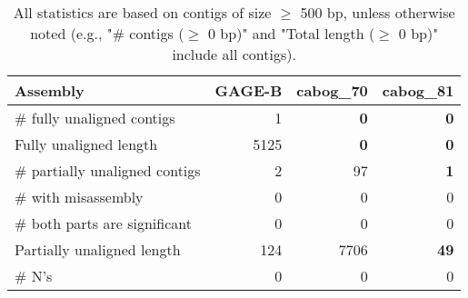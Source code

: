 \documentclass[12pt,a4paper]{article}
\begin{document}
\begin{table}[ht]
\begin{center}
\caption{All statistics are based on contigs of size $\geq$ 500 bp, unless otherwise noted (e.g., "\# contigs ($\geq$ 0 bp)" and "Total length ($\geq$ 0 bp)" include all contigs).}
\begin{tabular}{|l*{3}{|r}|}
\hline
Assembly & GAGE-B & cabog\_70 & cabog\_81 \\ \hline
\# fully unaligned contigs & 1 & {\bf 0} & {\bf 0} \\ \hline
Fully unaligned length & 5125 & {\bf 0} & {\bf 0} \\ \hline
\# partially unaligned contigs & 2 & 97 & {\bf 1} \\ \hline
\hspace{5mm}\# with misassembly & 0 & 0 & 0 \\ \hline
\hspace{5mm}\# both parts are significant & 0 & 0 & 0 \\ \hline
Partially unaligned length & 124 & 7706 & {\bf 49} \\ \hline
\# N's & 0 & 0 & 0 \\ \hline
\end{tabular}
\end{center}
\end{table}
\end{document}
